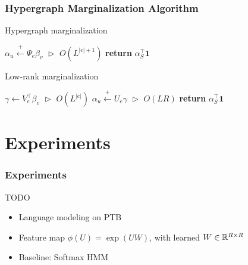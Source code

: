 \documentclass{beamer}
\begin{document}
\begin{frame}
\frametitle{Hypergraph Marginalization Algorithm}
\centering
\begin{algorithm}[H]
\caption{\label{alg:hypergraph-marg} Hypergraph marginalization}
\begin{algorithmic} 
\STATE $\alpha_u \stackrel{+}{\gets} \Psi_e\beta_v$
    \hfill $\vartriangleright$ $O(L^{|e|+1})$
\ENDFOR
\STATE \textbf{return} $\alpha_S^\top \mathbf{1}$
\end{algorithmic}

\end{algorithm}

\begin{algorithm}[H]
\caption{\label{alg:low-rank-update} Low-rank marginalization}
\begin{algorithmic} 
\STATE $\gamma \gets V_e^\top\beta_v$
    \hfill $\vartriangleright$ $O(L^{|e|})$
\STATE $\alpha_u \stackrel{+}{\gets} U_e\gamma $
    \hfill $\vartriangleright$ $O(LR)$
\ENDFOR
\STATE \textbf{return} $\alpha_S^\top\mathbf{1}$
\end{algorithmic} 
\end{algorithm}

\end{frame}


\section{Experiments}

\begin{frame}
\frametitle{Experiments}
TODO
\begin{itemize}
\item Language modeling on PTB
\vspace{2em}
\item Feature map $\phi(U) = \exp\left(U W\right)$,
with learned $W\in\mathbb{R}^{R \times R}$
\vspace{2em}
\item Baseline: Softmax HMM
\end{itemize}
\end{frame}
\end{document}
